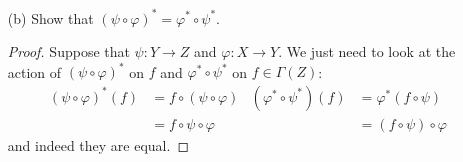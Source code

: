 \documentclass{article}
\begin{document}
\begin{itemize}
        \item [(b)] Show that $(\psi \circ \varphi)^{*} = \varphi^{*} \circ \psi^{*}$. 
            \begin{proof}
                Suppose that $\psi : Y \rightarrow Z$ and $\varphi: X \rightarrow Y$. We just need to look at the action of $(\psi \circ \varphi)^{*}$ on $f$ and $\varphi^{*} \circ \psi^{*}$ on $f \in \Gamma(Z)$:
                    \begin{align*}
                        (\psi \circ \varphi)^{*}(f) &= f \circ (\psi \circ \varphi) & (\varphi^{*} \circ \psi^{*})(f) &= \varphi^{*}(f \circ \psi)    \\
                                                    &= f \circ \psi \circ \varphi   &                                 &= (f \circ \psi) \circ \varphi   
                    \end{align*}
                and indeed they are equal.
            \end{proof}
    \end{itemize}
\end{document}
